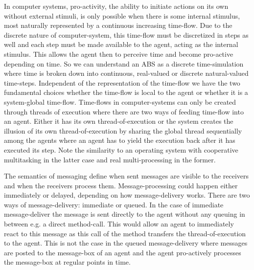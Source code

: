 In computer systems, pro-activity, the ability to initiate actions on its own without external stimuli, is only possible when there is some internal stimulus, most naturally represented by a continuous increasing time-flow. Due to the discrete nature of computer-system, this time-flow must be discretized in steps as well and each step must be made available to the agent, acting as the internal stimulus. This allows the agent then to perceive time and become pro-active depending on time. So we can understand an ABS as a discrete time-simulation where time is broken down into continuous, real-valued or discrete natural-valued time-steps. Independent of the representation of the time-flow we have the two fundamental choices whether the time-flow is local to the agent or whether it is a system-global time-flow. Time-flows in computer-systems can only be created through threads of execution where there are two ways of feeding time-flow into an agent. Either it has its own thread-of-execution or the system creates the illusion of its own thread-of-execution by sharing the global thread sequentially among the agents where an agent has to yield the execution back after it has executed its step. Note the similarity to an operating system with cooperative multitasking in the latter case and real multi-processing in the former.

The semantics of messaging define when sent messages are visible to the receivers and when the receivers process them. Message-processing could happen either immediately or delayed, depending on how message-delivery works. There are two ways of message-delivery: immediate or queued. In the case of immediate message-deliver the message is sent directly to the agent without any queuing in between e.g. a direct method-call. This would allow an agent to immediately react to this message as this call of the method transfers the thread-of-execution to the agent. This is not the case in the queued message-delivery where messages are posted to the message-box of an agent and the agent pro-actively processes the message-box at regular points in time.

